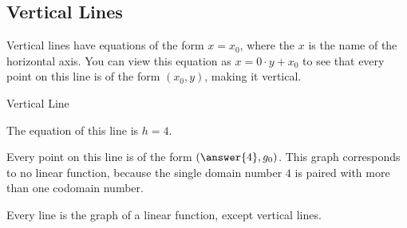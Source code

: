 \documentclass{ximera}
\begin{document}
\subsection{Vertical Lines} 


Vertical lines have equations of the form $x = x_0$, where the $x$ is the name of the horizontal axis. You can view this equation as $x = 0 \cdot y + x_0$ to see that every point on this line is of the form $(x_0,y)$, making it vertical.





\begin{example} Vertical Line


The equation of this line is $h=4$. 

\begin{image}
\end{image}

Every point on this line is of the form $\left(\answer{4}, g_0\right)$. This graph corresponds to no linear function, because the single domain number $4$ is paired with more than one codomain number.


\end{example}

Every line is the graph of a linear function, except vertical lines. \\
\end{document}
